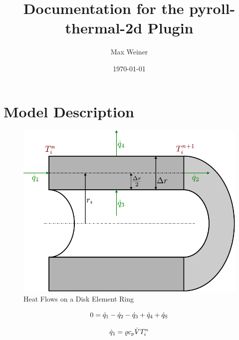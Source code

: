 \documentclass{scrartcl}
\begin{document}
    \title{Documentation for the pyroll-thermal-2d Plugin}
    \author{Max Weiner}
    \date{\today}

    \maketitle


    \section{Model Description}\label{sec:model-description}



    \begin{figure}
        \centering
        \includegraphics[scale=0.8]{img/heat_flow}
        \caption{Heat Flows on a Disk Element Ring}
        \label{fig:heat_flow}
    \end{figure}

    \begin{equation}
        0 = {\dot{q}}_1 - {\dot{q}}_2 - {\dot{q}}_3 + {\dot{q}}_4 + {\dot{q}_\mathrm{S}}
        \label{eq:heat_flow_balance}
    \end{equation}


    \begin{equation}
        {\dot{q}}_1 = {\varrho} {c_\mathrm{p}} {\dot{V}} {T}_{{i}}^{{n}}
        \label{eq:heat_flow_1}
    \end{equation}
\end{document}
